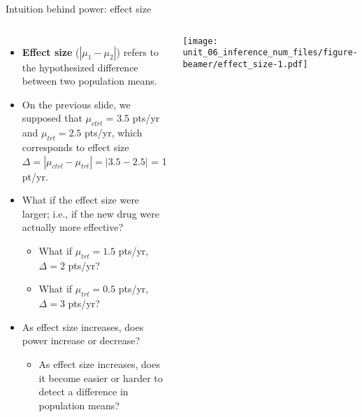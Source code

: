 \documentclass[
  ignorenonframetext,
  aspectratio=169]{beamer}
\newcommand{\columnsbegin}{\begin{columns}}
\newcommand{\columnsend}{\end{columns}}
\begin{document}
\begin{frame}{Intuition behind power: effect size}
\protect\hypertarget{intuition-behind-power-effect-size}{}
\columnsbegin


\footnotesize

\begin{itemize}
\item
  \textbf{Effect size} (\(|\mu_1 - \mu_2|\)) refers to the hypothesized
  difference between two population means.
\item
  On the previous slide, we supposed that \(\mu_{ctrl}\) = 3.5 pts/yr
  and \(\mu_{trt} = 2.5\) pts/yr, which corresponds to effect size
  \(\Delta = |\mu_{ctrl} - \mu_{trt}| = |3.5 - 2.5|\) = 1 pt/yr.
\item
  What if the effect size were larger; i.e., if the new drug were
  actually more effective?

  \begin{itemize}

    \footnotesize

    \item What if $\mu_{trt} = 1.5$ pts/yr, $\Delta = 2$ pts/yr?

    \item What if $\mu_{trt} = 0.5$ pts/yr, $\Delta = 3$ pts/yr?

    \end{itemize}
\item
  As effect size increases, does power increase or decrease?

  \begin{itemize}

    \footnotesize

    \item As effect size increases, does it become easier or harder to detect a difference in population means?

    \end{itemize}
\end{itemize}


\texttt{[image: unit\_06\_inference\_num\_files/figure-beamer/effect\_size-1.pdf]}

\columnsend
\end{frame}
\end{document}
